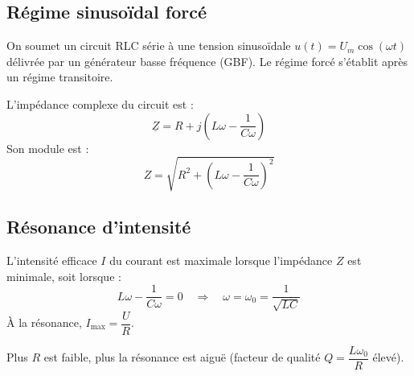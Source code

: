 \subsection{Régime sinusoïdal forcé}

\begin{definition}
On soumet un circuit RLC série à une tension sinusoïdale $u(t) = U_m \cos(\omega t)$ délivrée par un générateur basse fréquence (GBF). Le régime forcé s’établit après un régime transitoire.
\end{definition}

\begin{loi}
L’impédance complexe du circuit est :
\[
\underline{Z} = R + j\left(L\omega - \frac{1}{C\omega}\right)
\]
Son module est :
\[
Z = \sqrt{R^2 + \left(L\omega - \frac{1}{C\omega}\right)^2}
\]
\end{loi}

\subsection{Résonance d’intensité}

\begin{propriete}[Résonance]
L’intensité efficace $I$ du courant est maximale lorsque l’impédance $Z$ est minimale, soit lorsque :
\[
L\omega - \frac{1}{C\omega} = 0 \quad \Rightarrow \quad \omega = \omega_0 = \frac{1}{\sqrt{LC}}
\]
À la résonance, $I_{\text{max}} = \dfrac{U}{R}$.
\end{propriete}

\begin{illus}
\end{illus}

\begin{remarque}
Plus $R$ est faible, plus la résonance est aiguë (facteur de qualité $Q = \dfrac{L\omega_0}{R}$ élevé).
\end{remarque}

